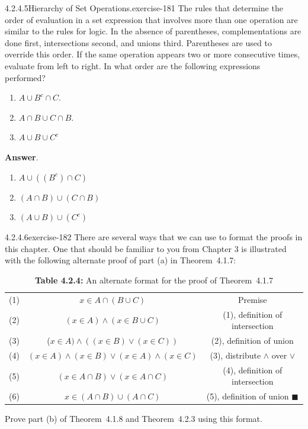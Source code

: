 \documentclass[twoside,10pt,]{book}
\numberwithin{equation}{section}
\begin{document}
\begin{divisionsolution}{4.2.4.5}{Hierarchy of Set Operations.}{exercise-181}%
\hypertarget{p-1610}{}%
The rules that determine the order of evaluation in a set expression that involves more than one operation are similar to the rules for logic. In the absence of parentheses, complementations are done first, intersections second, and unions third. Parentheses are used to override this order. If the same operation appears two or more consecutive times, evaluate from left to right. In what order are the following expressions performed?%
\par
\hypertarget{p-1611}{}%
\leavevmode%
\begin{multicols}{2}
\begin{enumerate}[label=(\alph*)]
\item\hypertarget{li-862}{}\(A \cup  B^c\cap C\).%
\item\hypertarget{li-863}{}\(A\cap B \cup  C\cap B\).%
\item\hypertarget{li-864}{}\(A \cup  B \cup  C^c\)%
\end{enumerate}
\end{multicols}
%
\par\smallskip%
\noindent\textbf{Answer}.\quad%
\hypertarget{p-1612}{}%
\leavevmode%
\begin{multicols}{3}
\begin{enumerate}[label=(\alph*)]
\item\hypertarget{li-865}{}\hypertarget{p-1613}{}%
\(A\cup ((B^c)\cap C)\)%
\item\hypertarget{li-866}{}\hypertarget{p-1614}{}%
\((A\cap B)\cup (C\cap B)\)%
\item\hypertarget{li-867}{}\hypertarget{p-1615}{}%
\((A\cup B)\cup (C^c)\)%
\end{enumerate}
\end{multicols}
%
\end{divisionsolution}%
\begin{divisionsolution}{4.2.4.6}{}{exercise-182}%
\hypertarget{p-1616}{}%
There are several ways that we can use to format the proofs in this chapter. One that should be familiar to you from Chapter 3 is illustrated with the following alternate proof of part (a) in Theorem~4.1.7:%
\begin{table}
\centering
\begin{tabular}{ccc}
(1)&\(x \in  A \cap  (B \cup  C)\)&Premise\tabularnewline[0pt]
(2)&\((x \in  A) \land  (x \in  B \cup  C)\)&(1), definition of intersection\tabularnewline[0pt]
(3)&(\(x \in  A) \land ((x \in  B) \lor  (x \in  C))\)&(2), definition of union\tabularnewline[0pt]
(4)&\((x \in A)\land (x\in  B)\lor  (x \in A)\land (x\in  C)\)&(3), distribute \(\land\) over \(\lor\)\tabularnewline[0pt]
(5)&\((x \in  A\cap B) \lor (x \in  A \cap C)\)&(4), definition of intersection\tabularnewline[0pt]
(6)&\(x \in  (A \cap B) \cup  (A \cap C)\)&(5), definition of union \(\blacksquare\)
\end{tabular}
\caption*{\textbf{Table 4.2.4:} An alternate format for the proof of Theorem~4.1.7}
\end{table}
\hypertarget{p-1617}{}%
Prove part (b) of Theorem~4.1.8 and Theorem~4.2.3 using this format.%
\end{divisionsolution}%
\end{document}
